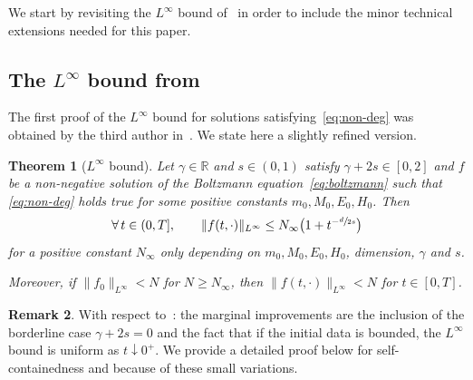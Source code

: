 \documentclass[11pt]{article}
\theoremstyle{plain}
\newtheorem{thm}{Theorem}[section]
\theoremstyle{definition}
\newtheorem{remark}[thm]{Remark}
\numberwithin{equation}{section}
\newcommand{\R}{\mathbb R}
\let\A N
\newcommand{\Ai}{N_\infty}
\begin{document}
We start by revisiting the $L^\infty$ bound
of~\cite{luis} in order to include the minor technical extensions
needed for this paper.

\subsection{The $L^\infty$ bound from \cite{luis}}

The first proof of the $L^\infty$ bound for solutions
satisfying~\eqref{eq:non-deg} was obtained by the third author
in~\cite[Th.\,1.2]{luis}. We state here a slightly refined version.

\begin{thm}[$L^\infty$ bound] \label{thm:linfty} Let
$\gamma \in \R$ and $s \in (0,1)$ satisfy $\gamma +2s \in [0,2]$ and
$f$ be a non-negative solution of the Boltzmann
equation~\eqref{eq:boltzmann} such that \eqref{eq:non-deg} holds
true for some positive constants $m_0,M_0,E_0,H_0$. Then
\[ \forall \, t \in (0,T], \qquad \|f(t,\cdot)\|_{L^\infty} \le \Ai
\bigl(1+ t^{-\sfrac{d}{2s}}\bigr) \] for a positive constant $\Ai$
only depending on $m_0,M_0,E_0,H_0$, dimension, $\gamma$ and $s$.

Moreover, if $\|f_0\|_{L^\infty} < \A$ for $\A \ge \A_\infty$, then $\|f(t,\cdot)\|_{L^\infty} < \A$ for $t\in[0,T]$.
\end{thm}

\begin{remark}
With respect to~\cite[Th.\,1.2]{luis}: the marginal improvements
are the inclusion of the borderline case $\gamma+2s=0$ and the fact
that if the initial data is bounded, the $L^\infty$ bound is uniform
as $t \downarrow 0^+$. We provide a detailed proof below for
self-containedness and because of these small variations.
\end{remark}
\end{document}

